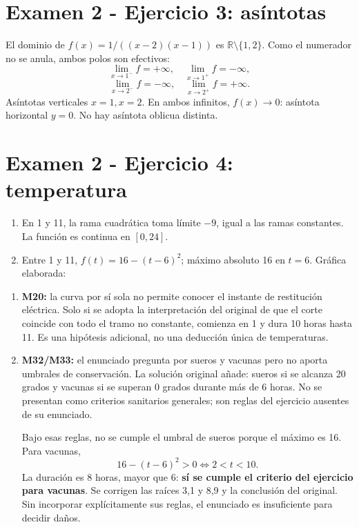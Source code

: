 \documentclass[11pt]{article}
\begin{document}
\section*{Examen 2 - Ejercicio 3: asíntotas}
El dominio de $f(x)=1/((x-2)(x-1))$ es $\mathbb R\setminus\{1,2\}$. Como el numerador no se anula, ambos polos son efectivos:
\[
\lim_{x\to1^-}f=+\infty,\quad\lim_{x\to1^+}f=-\infty,
\]
\[
\lim_{x\to2^-}f=-\infty,\quad\lim_{x\to2^+}f=+\infty.
\]
Asíntotas verticales $\boxed{x=1,x=2}$. En ambos infinitos, $f(x)\to0$: asíntota horizontal $\boxed{y=0}$. No hay asíntota oblicua distinta.
\clearpage
\section*{Examen 2 - Ejercicio 4: temperatura}
\begin{enumerate}[label=(\alph*)]
\item En 1 y 11, la rama cuadrática toma límite $-9$, igual a las ramas constantes. La función es continua en $[0,24]$.
\item Entre 1 y 11, $f(t)=16-(t-6)^2$; máximo absoluto 16 en $t=6$. Gráfica elaborada:
\end{enumerate}
\begin{center}\end{center}
\begin{enumerate}[label=(\alph*),start=3]
\item \textbf{M20:} la curva por sí sola no permite conocer el instante de restitución eléctrica. Solo si se adopta la interpretación del original de que el corte coincide con todo el tramo no constante, comienza en 1 y dura 10 horas hasta 11. Es una hipótesis adicional, no una deducción única de temperaturas.
\item \textbf{M32/M33:} el enunciado pregunta por sueros y vacunas pero no aporta umbrales de conservación. La solución original añade: sueros si se alcanza 20 grados y vacunas si se superan 0 grados durante más de 6 horas. No se presentan como criterios sanitarios generales; son reglas del ejercicio ausentes de su enunciado.

Bajo esas reglas, no se cumple el umbral de sueros porque el máximo es 16. Para vacunas,
\[
16-(t-6)^2>0\iff2<t<10.
\]
La duración es $\boxed8$ horas, mayor que 6: \textbf{sí se cumple el criterio del ejercicio para vacunas}. Se corrigen las raíces 3,1 y 8,9 y la conclusión del original. Sin incorporar explícitamente sus reglas, el enunciado es insuficiente para decidir daños.
\end{enumerate}
\end{document}
